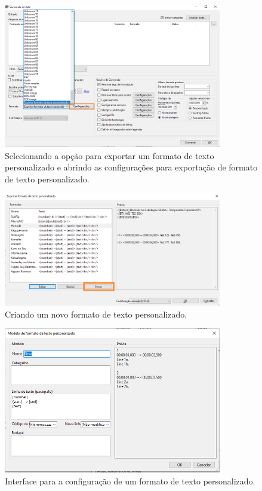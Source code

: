 \documentclass[portuguese]{textolivre}
\begin{document}
\begin{figure}[htbp]
 \centering
 \includegraphics[width=0.85\textwidth]{Fig20.png}
 \caption{Selecionando a opção para exportar um formato de texto personalizado  e abrindo as configurações para exportação de formato de texto personalizado.}
 \label{fig20}
\end{figure}

\begin{figure}[htbp]
 \centering
 \includegraphics[width=0.85\textwidth]{Fig21.png}
 \caption{Criando um novo formato de texto personalizado.}
 \label{fig21}
\end{figure}

\begin{figure}[htbp]
 \centering
 \includegraphics[width=0.85\textwidth]{Fig22.png}
 \caption{Interface para a configuração de um formato de texto personalizado.}
 \label{fig22}
\end{figure}
\end{document}
